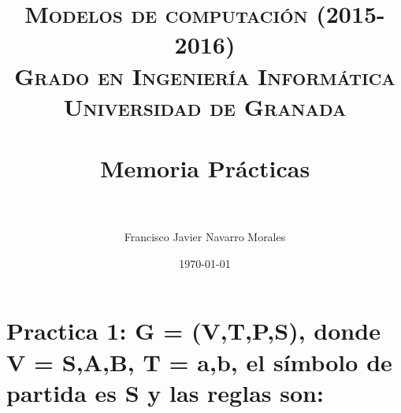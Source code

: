 
\graphicspath{ {images/} }


\title{	
\normalfont \normalsize 
\textsc{{\bf Modelos de computación (2015-2016)} \\ Grado en Ingeniería Informática \\ Universidad de Granada} \\ [25pt] %
\horrule{0.5pt} \\[0.4cm] %
\huge Memoria Prácticas \\ %
\horrule{2pt} \\[0.5cm] %
}

\author{Francisco Javier Navarro Morales} %

\date{\normalsize\today} %




\maketitle %

\newpage %

\tableofcontents %



\newpage


\section{Practica 1: G = (V,T,P,S), donde V = {S,A,B}, T = {a,b}, el símbolo de partida es S y las reglas son:}

